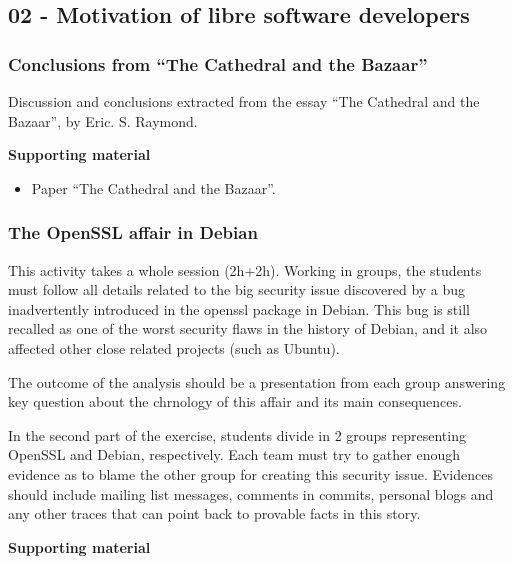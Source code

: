 \documentclass[a4paper]{article}
\begin{document}
\subsection{02 - Motivation of libre software developers}


\subsubsection{Conclusions from ``The Cathedral and the Bazaar''}
\label{sub:cathedral-bazaar}

Discussion and conclusions extracted from the essay ``The Cathedral and the Bazaar'', by Eric. S. Raymond.

\textbf{Supporting material}

\begin{itemize}
\item Paper ``The Cathedral and the Bazaar''.
\end{itemize}

\subsubsection{The OpenSSL affair in Debian}
\label{sub:openssl-affair}

This activity takes a whole session (2h+2h). Working in groups, the students must follow all details related to the big security issue
discovered by a bug inadvertently introduced in the openssl package in Debian. This bug is still recalled as one of the worst security
flaws in the history of Debian, and it also affected other close related projects (such as Ubuntu).

The outcome of the analysis should be a presentation from each group answering key question about the chrnology of this affair and its
main consequences.

In the second part of the exercise, students divide in 2 groups representing OpenSSL and Debian, respectively. Each team must try to gather
enough evidence as to blame the other group for creating this security issue. Evidences should include mailing list messages, comments in
commits, personal blogs and any other traces that can point back to provable facts in this story.

\textbf{Supporting material}
\end{document}
